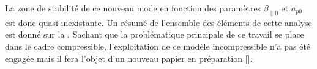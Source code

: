  
 La zone de stabilité de ce nouveau mode en fonction des paramètres $\beta_{\parallel 0}$ et $a_{p0}$ est donc quasi-inexistante. Un résumé de l'ensemble des éléments de cette analyse est donné sur la . Sachant que la problématique principale de ce travail se place dans le cadre compressible, l'exploitation de ce modèle incompressible n'a pas été engagée mais il fera l'objet d'un nouveau papier en préparation [\cite{simon_article_2023}].  

 
% 
